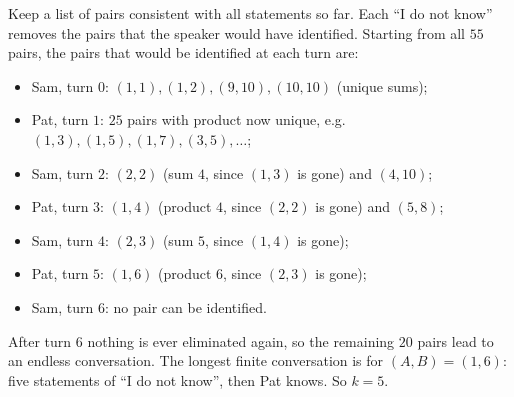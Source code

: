 Keep a list of pairs consistent with all statements so far. Each ``I do not know'' removes the pairs that the speaker would have identified. Starting from all $55$ pairs, the pairs that would be identified at each turn are:
\begin{itemize}
\item Sam, turn $0$: $(1,1),(1,2),(9,10),(10,10)$ (unique sums);
\item Pat, turn $1$: $25$ pairs with product now unique, e.g. $(1,3),(1,5),(1,7),(3,5),\dots$;
\item Sam, turn $2$: $(2,2)$ (sum $4$, since $(1,3)$ is gone) and $(4,10)$;
\item Pat, turn $3$: $(1,4)$ (product $4$, since $(2,2)$ is gone) and $(5,8)$;
\item Sam, turn $4$: $(2,3)$ (sum $5$, since $(1,4)$ is gone);
\item Pat, turn $5$: $(1,6)$ (product $6$, since $(2,3)$ is gone);
\item Sam, turn $6$: no pair can be identified.
\end{itemize}
After turn $6$ nothing is ever eliminated again, so the remaining $20$ pairs lead to an endless conversation. The longest finite conversation is for $(A,B)=(1,6)$: five statements of ``I do not know'', then Pat knows. So $k=\boxed{5}$.
